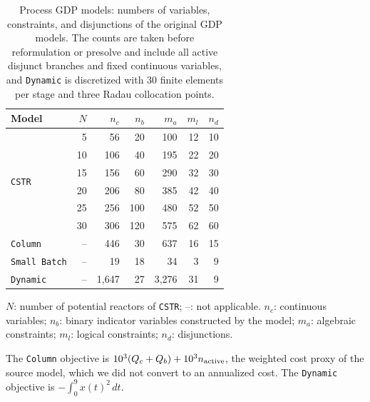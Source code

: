 \begin{table}[htbp]
\centering
\caption{Process GDP models: numbers of variables, constraints, and disjunctions of the original GDP models.
The counts are taken before reformulation or presolve and include all active disjunct branches and fixed continuous variables, and \texttt{Dynamic} is discretized with 30 finite elements per stage and three Radau collocation points.}
\label{tab:supp-model-sizes}
\footnotesize
\begin{threeparttable}
\begin{tabular}{@{}lrrrrrr@{}}
\toprule
Model & \(N\) & \(n_c\) & \(n_b\) & \(m_a\) & \(m_l\) & \(n_d\)\\\midrule
\multirow{6}{*}{\texttt{CSTR}} & 5 & 56 & 20 & 100 & 12 & 10 \\
 & 10 & 106 & 40 & 195 & 22 & 20 \\
 & 15 & 156 & 60 & 290 & 32 & 30 \\
 & 20 & 206 & 80 & 385 & 42 & 40 \\
 & 25 & 256 & 100 & 480 & 52 & 50 \\
 & 30 & 306 & 120 & 575 & 62 & 60 \\
\midrule
\texttt{Column} & -- & 446 & 30 & 637 & 16 & 15 \\
\midrule
\texttt{Small Batch} & -- & 19 & 18 & 34 & 3 & 9 \\
\midrule
\texttt{Dynamic} & -- & 1{,}647 & 27 & 3{,}276 & 31 & 9 \\
\bottomrule
\end{tabular}
\begin{tablenotes}[flushleft]\footnotesize
\item \(N\): number of potential reactors of \texttt{CSTR}; --: not applicable.
\(n_c\): continuous variables; \(n_b\): binary indicator variables constructed by the model; \(m_a\): algebraic constraints; \(m_l\): logical constraints; \(n_d\): disjunctions.
\end{tablenotes}
\end{threeparttable}
\end{table}

\FloatBarrier

The \texttt{Column} objective is \(10^3(Q_c+Q_b)+10^3 n_{\rm active}\), the weighted cost proxy of the source model, which we did not convert to an annualized cost.
The \texttt{Dynamic} objective is \(-\int_0^9 x(t)^2\,dt\).



